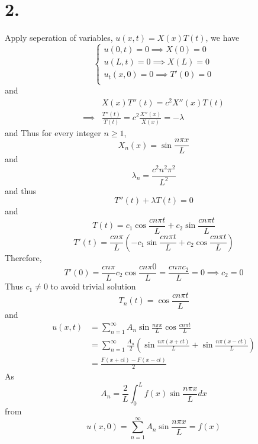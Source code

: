 \documentclass[11pt]{article}
\theoremstyle{mystyle}
\theoremstyle{definition}
\begin{document}
\section*{2.}
Apply seperation of variables, $u(x,t) = X(x) T(t)$, we have  \\
\[
  \begin{cases}
    u(0,t) = 0 \implies X(0) = 0 \\
    u(L,t) = 0 \implies X(L) = 0 \\
    u_t(x,0) = 0 \implies T'(0) = 0 \\
  \end{cases}
\]
and 
\begin{align*}
  &X(x) T''(t) = c^2 X''(x)T(t) \\
  \implies & \displaystyle\frac{T''(t)}{T(t)} = c^2 \displaystyle\frac{X''(x)}{X(x)} = -\lambda
\end{align*}
and
Thus for every integer $n\ge 1$,  
\[
  X_n(x) = \sin \displaystyle\frac{n\pi x}{L}
\]
and 
\[
  \lambda_n =  \displaystyle\frac{c^2 n^2\pi^2}{L^2}
\]
and thus 
\[
  T''(t) + \lambda T(t) = 0 
\]
and 
\[
  T(t) = c_1 \cos \displaystyle\frac{cn\pi t}{L} + c_2 \sin \displaystyle\frac{cn \pi t}{L}
\]
\[
  T'(t) = \displaystyle\frac{cn\pi}{L} \left( - c_1 \sin \displaystyle\frac{cn\pi t}{L} + c_2 \cos \displaystyle\frac{cn \pi t}{L} \right)
\]
Therefore, 
\[
  T'(0) = \displaystyle\frac{cn\pi }{L} c_2 \cos \displaystyle\frac{cn\pi 0}{L} = \displaystyle\frac{cn \pi c_2}{L} = 0 \implies c_2 = 0
\]
Thus $c_1 \ne 0$ to avoid trivial solution
\[
  T_n(t) = \cos \displaystyle\frac{cn\pi t}{L} 
\]
and 
\begin{align*}
  u(x,t) &= \sum_{n=1}^\infty A_n \sin \displaystyle\frac{n\pi x}{L} \cos \displaystyle\frac{cn\pi t}{L} \\
  &= \sum_{n=1}^\infty \displaystyle\frac{A_n}{2} \left(\sin \displaystyle\frac{n\pi(x+ct)}{L} + \sin \displaystyle\frac{n\pi(x-ct)}{L} \right) \\
  &= \displaystyle\frac{F(x+ct) - F(x-ct)}{2} 
\end{align*}
As 
\[
  A_n = \displaystyle\frac{2}{L} \int_0^L f(x) \sin \displaystyle\frac{n\pi x}{L} dx 
\]
from 
\[
  u(x,0) = \sum_{n=1}^\infty A_n \sin \displaystyle\frac{n\pi x}{L} = f(x)
\]
\newpage
\end{document}
